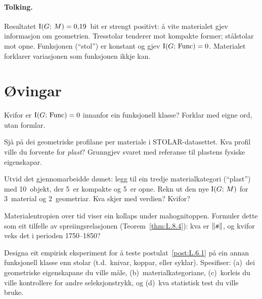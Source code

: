 \paragraph{Tolking.}
Resultatet $\operatorname{I}(G;\, M) = 0{,}19$~bit er strengt positivt: å vite
materialet gjev informasjon om geometrien. Tresstolar tenderer mot
kompakte former; stålstolar mot opne. Funksjonen (``stol'') er
konstant og gjev $\operatorname{I}(G;\, \mathrm{Func}) = 0$. Materialet
forklarer variasjonen som funksjonen ikkje kan.


\section{Øvingar}

\begin{exercise}[Nivå 1]\label{ex:8.1}
Kvifor er $\operatorname{I}(G;\, \mathrm{Func}) = 0$ innanfor ein funksjonell
klasse? Forklar med eigne ord, utan formlar.
\end{exercise}

\begin{exercise}[Nivå 1]\label{ex:8.2}
Sjå på dei geometriske profilane per materiale i
STOLAR-datasettet. Kva profil ville du forvente for \emph{plast}?
Grunngjev svaret med referanse til plastens fysiske eigenskapar.
\end{exercise}

\begin{exercise}[Nivå 2]\label{ex:8.3}
Utvid det gjennomarbeidde dømet: legg til ein tredje material\-kategori
(``plast'') med 10~objekt, der 5~er kompakte og 5~er opne. Rekn
ut den nye $\operatorname{I}(G;\, M)$ for 3~material og 2~geometriar. Kva
skjer med verdien? Kvifor?
\end{exercise}

\begin{exercise}[Nivå 2]\label{ex:8.4}
Materialentropien over tid viser ein kollaps under mahognitoppen.
Formuler dette som eit tilfelle av spreiingsrelasjonen
(Teorem~\ref{thm:L.8.4}): kva er $\lVert \bm{s} \rVert$, og kvifor
veks det i perioden 1750--1850?
\end{exercise}

\begin{exercise}[Nivå 3]\label{ex:8.5}
Designa eit empirisk eksperiment for å teste postulat~\ref{post:L.6.1}
på ein annan funksjonell klasse enn stolar (t.d.\ knivar, koppar,
eller syklar). Spesifiser: (a)~dei geometriske eigenskapane du
ville måle, (b)~materialkategoriane, (c)~korleis du ville
kontrollere for andre seleksjonstrykk, og (d)~kva statistisk test
du ville bruke.
\end{exercise}

